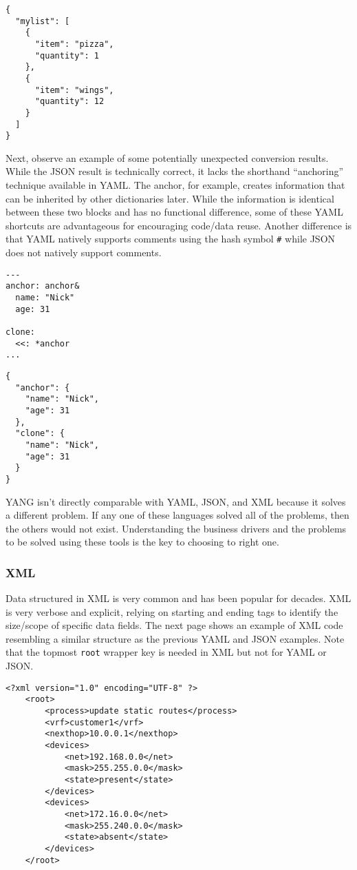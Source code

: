 \begin{verbatim}
{
  "mylist": [
    {
      "item": "pizza",
      "quantity": 1
    },
    {
      "item": "wings",
      "quantity": 12
    }
  ]
}
\end{verbatim}

Next, observe an example of some potentially unexpected conversion results.
While the JSON result is technically correct, it lacks the shorthand
``anchoring'' technique available in YAML\@. The anchor, for example, creates
information that can be inherited by other dictionaries later. While the
information is identical between these two blocks and has no functional
difference, some of these YAML shortcuts are advantageous for encouraging
code/data reuse. Another difference is that YAML natively supports comments
using the hash symbol \verb|#| while JSON does not natively support comments.

\begin{verbatim}
---
anchor: anchor&
  name: "Nick"
  age: 31

clone:
  <<: *anchor
...
\end{verbatim}

\begin{verbatim}
{
  "anchor": {
    "name": "Nick",
    "age": 31
  },
  "clone": {
    "name": "Nick",
    "age": 31
  }
}
\end{verbatim}

YANG isn’t directly comparable with YAML, JSON, and XML because it solves a
different problem. If any one of these languages solved all of the problems,
then the others would not exist. Understanding the business drivers and the
problems to be solved using these tools is the key to choosing to right one.

\subsubsection{XML}
Data structured in XML is very common and has been popular for decades. XML is
very verbose and explicit, relying on starting and ending tags to identify the
size/scope of specific data fields. The next page shows an example of XML code
resembling a similar structure as the previous YAML and JSON examples. Note
that the topmost \verb|root| wrapper key is needed in XML but not for YAML or
JSON\@.

\begin{verbatim}
<?xml version="1.0" encoding="UTF-8" ?>
	<root>
		<process>update static routes</process>
		<vrf>customer1</vrf>
		<nexthop>10.0.0.1</nexthop>
		<devices>
			<net>192.168.0.0</net>
			<mask>255.255.0.0</mask>
			<state>present</state>
		</devices>
		<devices>
			<net>172.16.0.0</net>
			<mask>255.240.0.0</mask>
			<state>absent</state>
		</devices>
	</root>
\end{verbatim}
